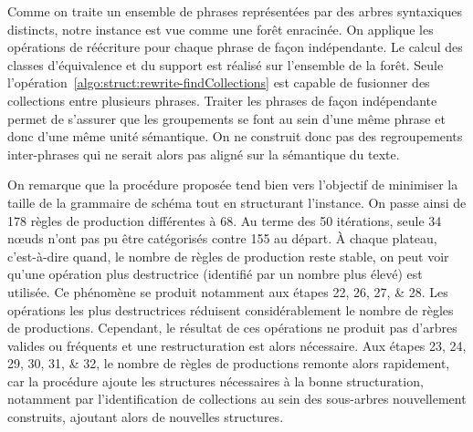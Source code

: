 Comme on traite un ensemble de phrases représentées par des arbres syntaxiques distincts, notre instance est vue comme une forêt enracinée.
On applique les opérations de réécriture pour chaque phrase de façon indépendante.
Le calcul des classes d'équivalence et du support est réalisé sur l'ensemble de la forêt.
Seule l'opération~\ref{algo:struct:rewrite-findCollections} est capable de fusionner des collections entre plusieurs phrases.
Traiter les phrases de façon indépendante permet de s'assurer que les groupements se font au sein d'une même phrase et donc d'une même unité sémantique.
On ne construit donc pas des regroupements inter-phrases qui ne serait alors pas aligné sur la sémantique du texte.

On remarque que la procédure proposée tend bien vers l'objectif de minimiser la taille de la grammaire de schéma tout en structurant l'instance.
On passe ainsi de \num{178} règles de production différentes à \num{68}.
Au terme des \num{50} itérations, seule \num{34} nœuds n'ont pas pu être catégorisés contre \num{155} au départ.
À chaque plateau, c'est-à-dire quand, le nombre de règles de production reste stable, on peut voir qu'une opération plus destructrice (identifié par un nombre plus élevé) est utilisée.
Ce phénomène se produit notamment aux étapes \numlist{22;26;27;28}.
Les opérations les plus destructrices réduisent considérablement le nombre de règles de productions.
Cependant, le résultat de ces opérations ne produit pas d'arbres valides ou fréquents et une restructuration est alors nécessaire.
Aux étapes \numlist{23;24;29;30;31;32}, le nombre de règles de productions remonte alors rapidement, car la procédure ajoute les structures nécessaires à la bonne structuration, notamment par l'identification de collections au sein des sous-arbres nouvellement construits, ajoutant alors de nouvelles structures.

